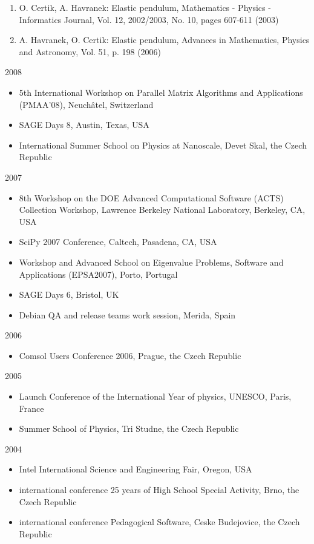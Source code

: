 \documentclass[a4paper,10pt]{article}
\newenvironment{packedenum}{
\begin{itemize}
  \setlength{\itemsep}{0pt}
  \setlength{\parskip}{0pt}
  \setlength{\parsep}{0pt}
}{\end{itemize}}
\begin{document}
\begin{enumerate}
\item O. Certik, A. Havranek: Elastic pendulum, Mathematics
   - Physics - Informatics Journal, Vol. 12, 2002/2003, No. 10, pages 607-611
   (2003)
\item A. Havranek, O. Certik: Elastic pendulum, Advances in Mathematics, Physics
   and Astronomy, Vol. 51, p. 198 (2006)
\end{enumerate}


{2008}
\begin{packedenum}
\item 5th International Workshop on Parallel Matrix Algorithms and Applications (PMAA'08), Neuchâtel, Switzerland
\item SAGE Days 8, Austin, Texas, USA
\item International Summer School on Physics at Nanoscale, Devet Skal, the Czech Republic
\end{packedenum}

{2007}
\begin{packedenum}
\item 8th Workshop on the DOE Advanced Computational Software (ACTS) Collection Workshop, Lawrence Berkeley National Laboratory, Berkeley, CA, USA
\item SciPy 2007 Conference, Caltech, Pasadena, CA, USA
\item Workshop and Advanced School on Eigenvalue Problems, Software and Applications (EPSA2007), Porto, Portugal
\item SAGE Days 6, Bristol, UK
\item Debian QA and release teams work session, Merida, Spain
\end{packedenum}

{2006}
\begin{packedenum}
\item Comsol Users Conference 2006, Prague, the Czech Republic
\end{packedenum}

{2005}
\begin{packedenum}
\item Launch Conference of the International Year of physics, UNESCO, Paris, France
\item Summer School of Physics, Tri Studne, the Czech Republic
\end{packedenum}

{2004}
\begin{packedenum}
\item Intel International Science and Engineering Fair, Oregon, USA
\item international conference 25 years of High School Special Activity, Brno,
  the Czech Republic
\item international conference Pedagogical Software, Ceske Budejovice,
  the Czech Republic
\end{packedenum}
\end{document}
